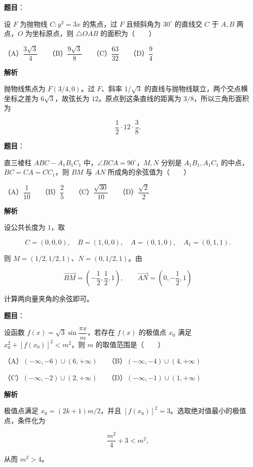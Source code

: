 \begin{answer}

\textbf{题目}：

设 $F$ 为抛物线 $C:y^2=3x$ 的焦点，过 $F$ 且倾斜角为 $30^\circ$ 的直线交 $C$ 于 $A,B$ 两点，$O$ 为坐标原点，则 $\triangle OAB$ 的面积为\mbox{（　　）}

（A）$\dfrac{3\sqrt3}{4}$　　（B）$\dfrac{9\sqrt3}{8}$　　（C）$\dfrac{63}{32}$　　（D）$\dfrac94$

\textbf{解析}

抛物线焦点为 $F(3/4,0)$。过 $F$、斜率 $1/\sqrt3$ 的直线与抛物线联立，两个交点横坐标之差为 $6\sqrt3$，故弦长为 $12$。原点到这条直线的距离为 $3/8$，所以三角形面积为

\nopagebreak[4]
\[
\frac12\cdot12\cdot\frac38.
\]


\end{answer}
\begin{answer}

\textbf{题目}：

直三棱柱 $ABC-A_1B_1C_1$ 中，$\angle BCA=90^\circ$，$M,N$ 分别是 $A_1B_1,A_1C_1$ 的中点，$BC=CA=CC_1$，则 $BM$ 与 $AN$ 所成角的余弦值为\mbox{（　　）}

（A）$\dfrac1{10}$　　（B）$\dfrac25$　　（C）$\dfrac{\sqrt{30}}{10}$　　（D）$\dfrac{\sqrt2}{2}$

\textbf{解析}

设公共长度为 $1$，取

\nopagebreak[4]
\[
C=(0,0,0),\quad B=(1,0,0),\quad A=(0,1,0),\quad A_1=(0,1,1).
\]

则 $M=(1/2,1/2,1)$、$N=(0,1/2,1)$。由

\nopagebreak[4]
\[
\overrightarrow{BM}=\left(-\frac12,\frac12,1\right),\qquad
\overrightarrow{AN}=\left(0,-\frac12,1\right)
\]

计算两向量夹角的余弦即可。


\end{answer}
\begin{answer}

\textbf{题目}：

设函数 $f(x)=\sqrt3\sin\dfrac{\pi x}{m}$，若存在 $f(x)$ 的极值点 $x_0$ 满足 $x_0^2+[f(x_0)]^2<m^2$，则 $m$ 的取值范围是\mbox{（　　）}

（A）$(-\infty,-6)\cup(6,+\infty)$　　（B）$(-\infty,-4)\cup(4,+\infty)$

（C）$(-\infty,-2)\cup(2,+\infty)$　　（D）$(-\infty,-1)\cup(1,+\infty)$

\textbf{解析}

极值点满足 $x_0=(2k+1)m/2$，并且 $[f(x_0)]^2=3$。选取绝对值最小的极值点，条件化为

\nopagebreak[4]
\[
\frac{m^2}{4}+3<m^2,
\]

从而 $m^2>4$。


\end{answer}

